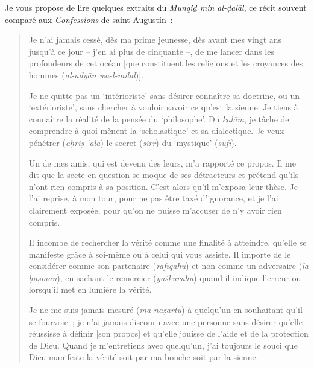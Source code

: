 Je vous propose de lire quelques extraits du \emph{Munqiḏ min
al-ḍalāl}, ce récit souvent comparé aux \emph{Confessions}
de saint Augustin~:
\begin{quote}
    
Je n'ai jamais cessé, dès ma prime jeunesse, dès avant mes vingt ans
jusqu'à ce jour -- j'en ai plus de cinquante --, de me lancer dans les
profondeurs de cet océan {[}que constituent les religions et les
croyances des hommes (\emph{al-adyān wa-l-milal}){]}.

Je ne quitte pas un `intérioriste' sans désirer connaître sa doctrine,
ou un `extérioriste', sans chercher à vouloir savoir ce qu'est la
sienne. Je tiens à connaître la réalité de la pensée du `philosophe'. Du
\emph{kalām}, je tâche de comprendre à quoi mènent la `scholastique' et
sa dialectique. Je veux pénétrer (\emph{aḥriṣ `alā}) le secret
(\emph{sirr}) du `mystique' (\emph{sūfī}).

Un de mes amis, qui est devenu des leurs, m'a rapporté ce propos. Il me
dit que la secte en question se moque de ses détracteurs et prétend
qu'ils n'ont rien compris à sa position. C'est alors qu'il m'exposa leur
thèse. Je l'ai reprise, à mon tour, pour ne pas être taxé d'ignorance,
et je l'ai clairement exposée, pour qu'on ne puisse m'accuser de n'y
avoir rien compris.

Il incombe de rechercher la vérité comme une finalité à atteindre,
qu'elle se manifeste grâce à soi-même ou à celui qui vous assiste. Il
importe de le considérer comme son partenaire (\emph{rafīqahu}) et non
comme un adversaire (\emph{lā ḫaṣman}), en sachant le remercier
(\emph{yaškuruhu}) quand il indique l'erreur ou lorsqu'il met en lumière
la vérité.

Je ne me suis jamais mesuré (\emph{mā nāẓartu}) à quelqu'un en
souhaitant qu'il se fourvoie~; je n'ai jamais discouru avec une personne
sans désirer qu'elle réussisse à définir {[}son propos{]} et qu'elle
jouisse de l'aide et de la protection de Dieu. Quand je m'entretiens
avec quelqu'un, j'ai toujours le souci que Dieu manifeste la vérité soit
par ma bouche soit par la sienne.
\end{quote}

